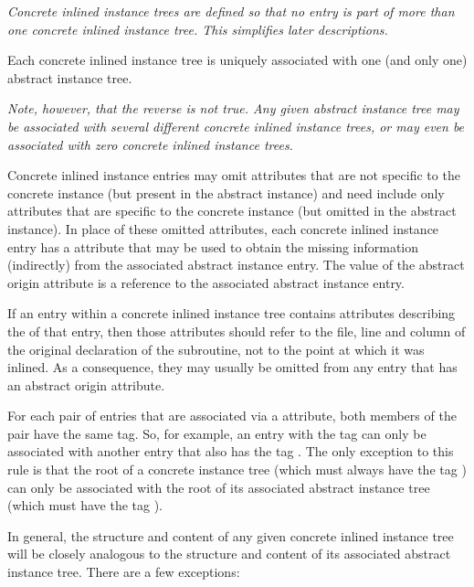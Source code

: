 \textit{Concrete inlined instance trees are defined so that no entry
is part of more than one concrete inlined instance tree. This
simplifies later descriptions.}

Each concrete inlined instance tree is uniquely associated
with one (and only one) abstract instance tree.

\textit{Note, however, that the reverse is not true. Any given abstract
instance tree may be associated with several different concrete
inlined instance trees, or may even be associated with zero
concrete inlined instance trees.}

Concrete inlined instance entries may omit attributes that
are not specific to the concrete instance (but present in
the abstract instance) and need include only attributes that
are specific to the concrete instance (but omitted in the
abstract instance). In place of these omitted attributes, 
each\hypertarget{chap:DWATabstractorigininlineinstance}{}
concrete inlined instance entry has a
\DWATabstractoriginDEFN{}
attribute that may be used to obtain the missing information
(indirectly) from the associated abstract instance entry. The
value of the abstract origin attribute is a reference to the
associated abstract instance entry.

If an entry within a concrete inlined instance tree contains
attributes describing the 
of that entry, then those attributes should refer to the file, line
and column of the original declaration of the subroutine,
not to the point at which it was inlined. As a consequence,
they may usually be omitted from any entry that has an abstract
origin attribute.

For each pair of entries that are associated via a
\DWATabstractorigin{} attribute, both members of the pair
have the same tag. So, for example, an entry with the tag
\DWTAGvariable{} can only be associated with another entry
that also has the tag \DWTAGvariable. The only exception
to this rule is that the root of a concrete instance tree
(which must always have the tag \DWTAGinlinedsubroutine)
can only be associated with the root of its associated abstract
instance tree (which must have the tag \DWTAGsubprogram).

In general, the structure and content of any given concrete
inlined instance tree will be closely analogous to the
structure and content of its associated abstract instance
tree. There are a few exceptions:


